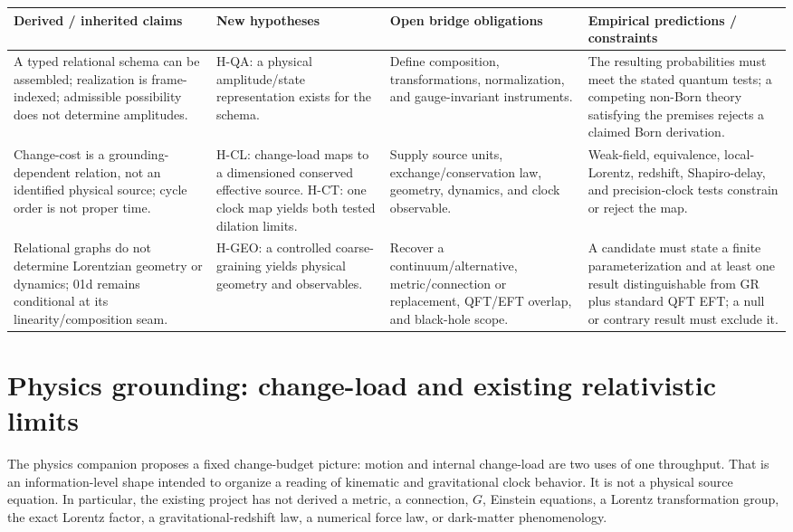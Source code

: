 \documentclass[11pt,a4paper]{article}
\theoremstyle{remark}
\begin{document}
\begin{center}\small
\begin{tabular}{@{}>{\raggedright\arraybackslash}p{}>{\raggedright\arraybackslash}p{}>{\raggedright\arraybackslash}p{}>{\raggedright\arraybackslash}p{}@{}}
\toprule
\textbf{Derived / inherited claims} & \textbf{New hypotheses} & \textbf{Open bridge obligations} & \textbf{Empirical predictions / constraints}\\
\midrule
A typed relational schema can be assembled; realization is frame-indexed; admissible possibility does not determine amplitudes. & H-QA: a physical amplitude/state representation exists for the schema. & Define composition, transformations, normalization, and gauge-invariant instruments. & The resulting probabilities must meet the stated quantum tests; a competing non-Born theory satisfying the premises rejects a claimed Born derivation.\\
\addlinespace
Change-cost is a grounding-dependent relation, not an identified physical source; cycle order is not proper time. & H-CL: change-load maps to a dimensioned conserved effective source. H-CT: one clock map yields both tested dilation limits. & Supply source units, exchange/conservation law, geometry, dynamics, and clock observable. & Weak-field, equivalence, local-Lorentz, redshift, Shapiro-delay, and precision-clock tests constrain or reject the map.\\
\addlinespace
Relational graphs do not determine Lorentzian geometry or dynamics; 01d remains conditional at its linearity/composition seam. & H-GEO: a controlled coarse-graining yields physical geometry and observables. & Recover a continuum/alternative, metric/connection or replacement, QFT/EFT overlap, and black-hole scope. & A candidate must state a finite parameterization and at least one result distinguishable from GR plus standard QFT EFT; a null or contrary result must exclude it.\\
\bottomrule
\end{tabular}
\end{center}

\section{Physics grounding: change-load and existing relativistic limits}\label{sec:physics}
The physics companion proposes a fixed change-budget picture: motion and
internal change-load are two uses of one throughput. That is an information-level
shape intended to organize a reading of kinematic and gravitational clock
behavior. It is not a physical source equation. In particular, the existing
project has not derived a metric, a connection, $G$, Einstein equations, a
Lorentz transformation group, the exact Lorentz factor, a gravitational-redshift
law, a numerical force law, or dark-matter phenomenology.
\end{document}
